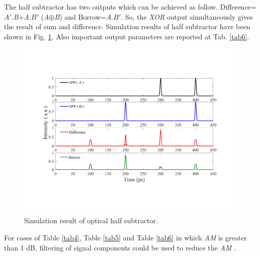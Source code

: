 \documentclass{osa-article}
\begin{document}
The half subtractor has two outputs which can be achieved as follow. Difference=$A'$.\textit {B}+\textit {A}.$B'$ (\textit {A}$\oplus$\textit {B}) and Borrow=\textit {A}.$B'$. So, the \textit{XOR} output simultaneously gives the result of sum and difference. Simulation results of half subtractor have been shown in Fig. \ref{fig6_subtractor}. Also important output parameters are reported at Tab. \ref{tab6}.
   \begin{figure}[tb]
\centering
\includegraphics[width=3 in]{figs/fig6_subtractor.pdf}
	\caption{Simulation result of optical half subtractor.}
	\label{fig6_subtractor}
\end{figure}

\begin{table}[H]
\caption{The parameters of flower-like structure  as half subtractor.}
\centering 
{}
\label{tab6} %
\end{table}
For cases of Table \ref{tab4}, Table \ref{tab5} and Table \ref{tab6} in which \textit{AM} is greater than 1 dB, filtering of signal components could be used to reduce the \textit{AM} \cite{rizou2014semiconductor}.
\end{document}
